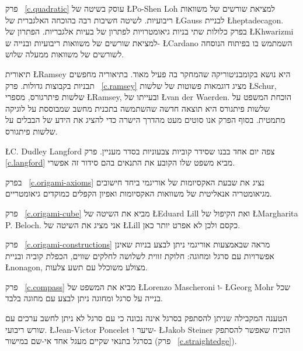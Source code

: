 
פרק~%
\ref{c.quadratic}
עוסק בשיטה של
\L{Po-Shen Loh}
למציאת שורשים של משוואות ריבועיות. לשיטה חשיבות רבה בהוכחה האלגברית של
\L{Gauss}
לבניית 
\L{heptadecagon}.
בפרק כלולות שתי בניות גיאומטרויות לפתרון של בעיות אלגבריות. הפתרון של
\L{Khwarizmi}
למציאת שורשים של משוואות ריבועיות ובנייה ש-%
\L{Cardano}
השמתמש בו בפיתוח הנוסחה לשורשים של משוואות ממעלה שלוש.


תיאורית 
\L{Ramsey}
היא נושא בקומבניטוריקה שהמחקר בה פעיל מאוד. בתיאוריה מחפשים תבניות בקבוצות גדולות. פרק~%
\ref{c.ramsey}
מציג דוגמאות פשוטות של שלשות
\L{Schur},
שלשות פיתרגורס,
מספרי 
\L{Ramsey},
ובעייתו של
\L{van der Waerden}.
הוכחת המשפט על שלשות פיתגורס היא תוצאה חדשה שהשתמשה בתכנית מחשב שמבוססת על לוגיקה מתמטית. בסוף הפרק אנו סוטים מעט מהדרך הישרה כדי להציג את הידע של הבבלים על שלשות פיתגורס.

\L{C. Dudley Langford}
צפה יום אחד בבנו שסידר קוביות צבעוניות בסדר מעניין. 
פרק~%
\ref{c.langford}
מביא משפט שלו הקובע את התנאים בהם סידור זה אפשרי.


\newpage

בפרק%
~\ref{c.origami-axioms}
נציג את שבעת האקסיומות של אוריגמי ביחד חישובים מגיאומטריה אנאליטית של משוואות האקסיומות ואפיון הקפלים כמוקדים גיאומטריים.

פרק~%
\ref{c.origami-cube}
מביא את השיטה של
\L{Eduard Lill}
ואת הקיפול של
\L{Margharita P. Beloch}.
אני מציג את השיטה של
\L{Lill}
כקסם ולכן לא אפרט יותר כאן.

פרק~%
\ref{c.origami-constructions}
מראה שבאמצעות אוריגמי ניתן לבצע בניות שאינן אפשרויות עם סרגל ומחוגה: חלוקת זווית לשלושה לחלקים שווים, הכפלת קוביה ובניית 
\L{nonagon},
מצולע משוכלל עם תשע צלעות.


פרק~%
\ref{c.compass}
מביא את המשפט של 
\L{Lorenzo Mascheroni}
ו-%
\L{Georg Mohr} 
שכל בנייה על סרגל ומחוגה ניתן לבצע עם מחוגה בלבד.

הטענה המקבילה שניתן להסתפק בסרגל אינה נכונה כי עם סרגל לא ניתן לחשב ערכים עם שורש ריבועי.
\L{Jean-Victor Poncelet}
שיער ו-%
\L{Jakob Steiner}
הוכיח שאפשר להסתפק בסרגל בתנאי שקיים מעגל אחד אי-שם במישור (פרק~%
\ref{c.straightedge}).


